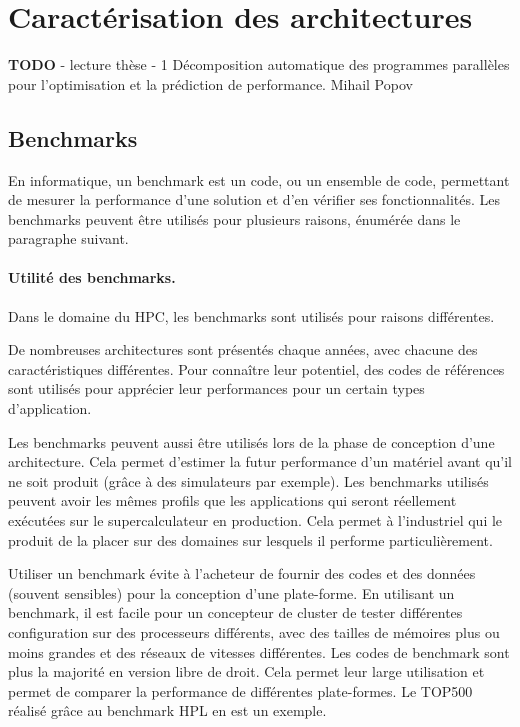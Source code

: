 \section{Caractérisation des architectures}\label{sec:caracterisation}


\textbf{TODO}
- lecture thèse - 1 Décomposition automatique des programmes parallèles pour l’optimisation et la prédiction de performance. Mihail Popov\\




\subsection{Benchmarks}

En informatique, un benchmark est un code, ou un ensemble de code, permettant de mesurer la performance d'une solution et d'en vérifier ses fonctionnalités. Les benchmarks peuvent être utilisés pour plusieurs raisons, énumérée dans le paragraphe suivant. 

\paragraph{Utilité des benchmarks.}
Dans le domaine du HPC, les benchmarks sont utilisés pour raisons différentes. 
    
    De nombreuses architectures sont présentés chaque années, avec chacune des caractéristiques différentes. Pour connaître leur potentiel, des codes de références sont utilisés pour apprécier leur performances pour un certain types d'application. 
    
    Les benchmarks peuvent aussi être utilisés lors de la phase de conception d'une architecture. Cela permet d'estimer la futur performance d'un matériel avant qu'il ne soit produit (grâce à des simulateurs par exemple). Les benchmarks utilisés peuvent avoir les mêmes profils que les applications qui seront réellement exécutées sur le supercalculateur en production. Cela permet à l'industriel qui le produit de la placer sur des domaines sur lesquels il performe particulièrement.
     
    
    Utiliser un benchmark évite à l'acheteur de fournir des codes et des données (souvent sensibles) pour la conception d'une plate-forme. En utilisant un benchmark, il est facile pour un concepteur de cluster de tester différentes configuration sur des processeurs différents, avec des tailles de mémoires plus ou moins grandes et des réseaux de vitesses différentes. 
    Les codes de benchmark sont plus la majorité en version libre de droit. Cela permet leur large utilisation et permet de comparer la performance de différentes plate-formes. Le TOP500 réalisé grâce au benchmark HPL en est un exemple.
     
